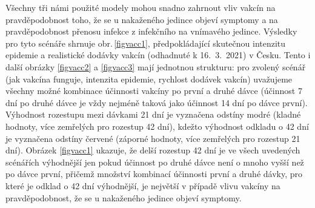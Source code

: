 Všechny tři námi použité modely mohou snadno zahrnout vliv vakcín na pravděpodobnost toho, že se u nakaženého jedince objeví symptomy a na pravděpodobnost přenosu infekce z infekčního na vnímavého jedince. Výsledky pro tyto scénáře shrnuje obr.\,\ref{figvacc1}, předpokládající skutečnou intenzitu epidemie a realistické dodávky vakcín (odhadnuté k 16.\ 3.\ 2021) v Česku. Tento i další obrázky \ref{figvacc2} a \ref{figvacc3} mají jednotnou strukturu: pro zvolený scénář (jak vakcína funguje, intenzita epidemie, rychlost dodávek vakcín) uvažujeme všechny možné kombinace účinnosti vakcíny po první a druhé dávce (účinnost 7 dní po druhé dávce je vždy nejméně taková jako účinnost 14 dní po dávce první). Výhodnost rozestupu mezi dávkami 21 dní je vyznačena odstíny modré (kladné hodnoty, více zemřelých pro rozestup 42 dní), kdežto výhodnost odkladu o 42 dní je vyznačena odstíny červené (záporné hodnoty, více zemřelých pro rozestup 21 dní). Obrázek \ref{figvacc1} ukazuje, že delší rozestup 42 dní je ve všech uvedených scénářích výhodnější jen pokud účinnost po druhé dávce není o mnoho vyšší než po dávce první, přičemž množství kombinací účinnosti první a druhé dávky, pro které je odklad o 42 dní výhodnější, je největší v případě vlivu vakcíny na pravděpodobnost, že se u nakaženého jedince objeví symptomy.

